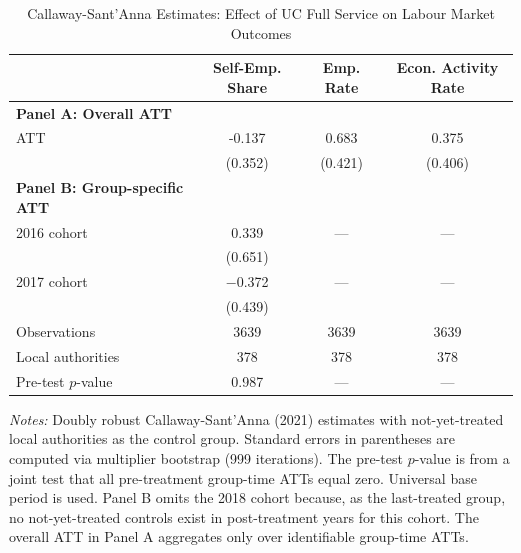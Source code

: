 
\begin{table}[htbp]
\centering
\caption{Callaway-Sant'Anna Estimates: Effect of UC Full Service on Labour Market Outcomes}
\label{tab:cs}
\begin{tabular}{lccc}
\toprule
& Self-Emp. Share & Emp. Rate & Econ. Activity Rate \\
\midrule
\textbf{Panel A: Overall ATT} & & & \\
ATT & -0.137 & 0.683 & 0.375 \\
& (0.352) & (0.421) & (0.406) \\
\midrule
\textbf{Panel B: Group-specific ATT} & & & \\
2016 cohort & 0.339 & --- & --- \\
& (0.651) & & \\
2017 cohort & $-$0.372 & --- & --- \\
& (0.439) & & \\
\midrule
Observations & 3639 & 3639 & 3639 \\
Local authorities & 378 & 378 & 378 \\
Pre-test $p$-value & 0.987 & --- & --- \\
\bottomrule
\end{tabular}
\begin{tablenotes}
\small
\item \textit{Notes:} Doubly robust Callaway-Sant'Anna (2021) estimates with not-yet-treated local authorities as the control group. Standard errors in parentheses are computed via multiplier bootstrap (999 iterations). The pre-test $p$-value is from a joint test that all pre-treatment group-time ATTs equal zero. Universal base period is used. Panel B omits the 2018 cohort because, as the last-treated group, no not-yet-treated controls exist in post-treatment years for this cohort. The overall ATT in Panel A aggregates only over identifiable group-time ATTs.
\end{tablenotes}
\end{table}

